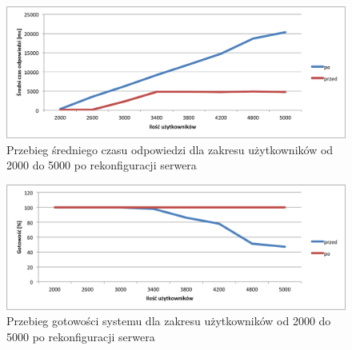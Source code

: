 \begin{figure}[ht]
	\centering
		\includegraphics[width=1\linewidth]{assets/sredni3.png}
		\caption{Przebieg średniego czasu odpowiedzi dla zakresu użytkowników od 2000 do 5000 po rekonfiguracji serwera}
	\label{fig:sred3}
\end{figure}

\begin{figure}[ht]
	\centering
		\includegraphics[width=1\linewidth]{assets/gotowosc3.png}
		\caption{Przebieg gotowości systemu dla zakresu użytkowników od 2000 do 5000 po rekonfiguracji serwera}
	\label{fig:got3}
\end{figure}
